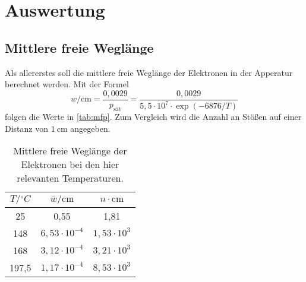 \section{Auswertung}
\label{sec:Auswertung}

\subsection{Mittlere freie Weglänge}
\label{sec:Mittlere freie Weglänge}
Als allererstes soll die mittlere freie Weglänge der Elektronen in der Apperatur berechnet
werden. Mit der Formel
\[
	w / \si{\centi\meter} = \frac{0,0029}{p_\text{sät}} = \frac{0,0029}{5,5 \cdot 10^7
	\cdot \exp(-6876 / T)}
\]
folgen die Werte in \autoref{tab:mfp}. Zum Vergleich wird die Anzahl an Stößen auf einer
Distanz von $\SI{1}{\centi\meter}$ angegeben.
\begin{table}
	\centering
	\caption{Mittlere freie Weglänge der Elektronen bei den hier relevanten
	Temperaturen.}
	\label{tab:mfp}
	\begin{tabular}{c c c}
		\toprule
		$T / \si{^\circ C}$ & $\overline{w} / \si{\centi\meter}$ & $n \cdot
		\si{\centi\meter}$ \\
		\midrule
		 25    & 0,55 & 1,81 \\
		 148   & $6,53 \cdot 10^{-4}$ & $1,53 \cdot 10^{3}$ \\
		 168   & $3,12 \cdot 10^{-4}$ & $3,21 \cdot 10^{3}$ \\
		 197,5 & $1,17 \cdot 10^{-4}$ & $8,53 \cdot 10^{3}$ \\
		\bottomrule
	\end{tabular}
\end{table}

